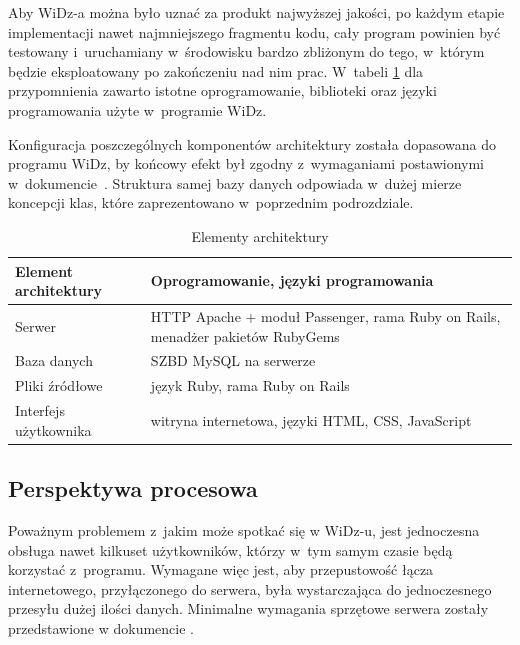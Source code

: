 \documentclass[12pt,leqno,twoside]{mwart}
\begin{document}
\indent Aby WiDz-a można było uznać za produkt najwyższej jakości, po każdym etapie implementacji nawet najmniejszego fragmentu kodu, cały program powinien być testowany i~uruchamiany w~środowisku bardzo zbliżonym do tego, w~którym będzie eksploatowany po zakończeniu nad nim prac. W~tabeli \ref{elementy_architektury} dla przypomnienia zawarto istotne oprogramowanie, biblioteki oraz języki programowania użyte w~programie WiDz.

\indent Konfiguracja poszczególnych komponentów architektury została dopasowana do programu WiDz, by końcowy efekt był zgodny z~wymaganiami postawionymi w~dokumencie~\cite{WYM}. Struktura samej bazy danych odpowiada w~dużej mierze koncepcji klas, które zaprezentowano w~poprzednim podrozdziale.
\begin{table}[h]
	\centering
	\caption{Elementy architektury}
		\begin{tabular}{|l|p{10cm}|}
		\hline
		\textbf{Element architektury} & \textbf{Oprogramowanie, języki programowania} \\ \hline
		Serwer & HTTP Apache + moduł Passenger, rama Ruby on Rails, menadżer pakietów RubyGems \\ \hline
		Baza danych & SZBD MySQL na serwerze \\ \hline
		Pliki źródłowe & język Ruby, rama Ruby on Rails \\ \hline
		Interfejs użytkownika & witryna internetowa, języki HTML, CSS, JavaScript \\ \hline
		\end{tabular}
	\label{elementy_architektury}
\end{table}

\subsection{Perspektywa procesowa}
\noindent Poważnym problemem z~jakim może spotkać się w WiDz-u, jest jednoczesna obsługa nawet kilkuset użytkowników, którzy w~tym samym czasie będą korzystać z~programu. Wymagane więc jest, aby przepustowość łącza internetowego, przyłączonego do serwera, była wystarczająca do jednoczesnego przesyłu dużej ilości danych. Minimalne wymagania sprzętowe serwera zostały przedstawione w dokumencie \cite{WYM}.
\end{document}
